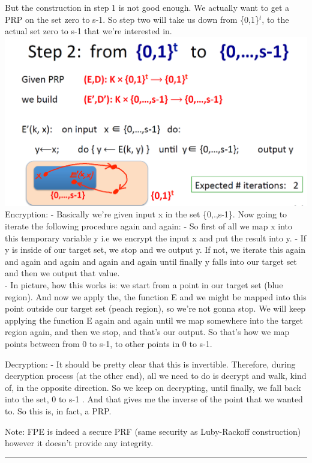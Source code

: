 \documentclass[11pt]{article}
\makeatletter
\def\maxwidth{\ifdim\Gin@nat@width>\linewidth\linewidth
    \else\Gin@nat@width\fi}
\let\Oldincludegraphics\includegraphics
\renewcommand{\includegraphics}[1]{\Oldincludegraphics[width=.8\maxwidth]{#1}}
\makeatother
\begin{document}
But the construction in step 1 is not good enough. We actually want to
get a PRP on the set zero to s-1. So step two will take us down from
\{0,1\}\(^t\), to the actual set zero to s-1 that we're interested in.
\includegraphics{./Images/Step2Shrink.png} Encryption: - Basically we're
given input x in the set \{0,.,s-1\}. Now going to iterate the following
procedure again and again: - So first of all we map x into this
temporary variable y i.e we encrypt the input x and put the result into
y. - If y is inside of our target set, we stop and we output y. If not,
we iterate this again and again and again and again and again until
finally y falls into our target set and then we output that value. \\
- In picture, how this works is: we start from a point in our target set
(blue region). And now we apply the, the function E and we might be
mapped into this point outside our target set (peach region), so we're
not gonna stop. We will keep applying the function E again and again
until we map somewhere into the target region again, and then we stop,
and that's our output. So that's how we map points between from 0 to
s-1, to other points in 0 to s-1.

Decryption: - It should be pretty clear that this is invertible.
Therefore, during decryption process (at the other end), all we need to
do is decrypt and walk, kind of, in the opposite direction. So we keep
on decrypting, until finally, we fall back into the set, 0 to s-1 . And
that gives me the inverse of the point that we wanted to. So this is, in
fact, a PRP.

Note: FPE is indeed a secure PRF (same security as Luby-Rackoff
construction) however it doesn't provide any integrity.

\begin{center}\rule{0.5\linewidth}{\linethickness}\end{center}
\end{document}
